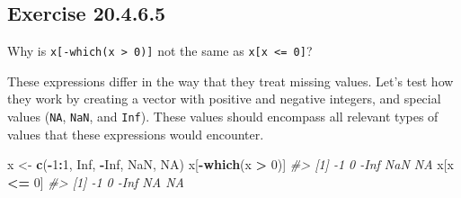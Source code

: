 \documentclass[]{book}
\newenvironment{Shaded}{\begin{snugshade}}{\end{snugshade}}
\newcommand{\CommentTok}[1]{\textcolor[rgb]{0.56,0.35,0.01}{\textit{#1}}}
\newcommand{\ControlFlowTok}[1]{\textcolor[rgb]{0.13,0.29,0.53}{\textbf{#1}}}
\newcommand{\DecValTok}[1]{\textcolor[rgb]{0.00,0.00,0.81}{#1}}
\newcommand{\KeywordTok}[1]{\textcolor[rgb]{0.13,0.29,0.53}{\textbf{#1}}}
\newcommand{\NormalTok}[1]{#1}
\newcommand{\OperatorTok}[1]{\textcolor[rgb]{0.81,0.36,0.00}{\textbf{#1}}}
\newcommand{\OtherTok}[1]{\textcolor[rgb]{0.56,0.35,0.01}{#1}}
\newcommand{\StringTok}[1]{\textcolor[rgb]{0.31,0.60,0.02}{#1}}
\theoremstyle{plain}
\theoremstyle{remark}
\begin{document}
\begin{enumerate}
\begin{Shaded}
\end{Shaded}
\end{enumerate}

\hypertarget{exercise-20.4.6.5}{%
\subsection*{\texorpdfstring{Exercise
{20.4.6.5}}{Exercise 20.4.6.5}}\label{exercise-20.4.6.5}}

Why is \texttt{x{[}-which(x\ \textgreater{}\ 0){]}} not the same as
\texttt{x{[}x\ \textless{}=\ 0{]}}?

These expressions differ in the way that they treat missing values.
Let's test how they work by creating a vector with positive and negative
integers, and special values (\texttt{NA}, \texttt{NaN}, and
\texttt{Inf}). These values should encompass all relevant types of
values that these expressions would encounter.

\begin{Shaded}
\begin{Highlighting}[]
\NormalTok{x <-}\StringTok{ }\KeywordTok{c}\NormalTok{(}\OperatorTok{-}\DecValTok{1}\OperatorTok{:}\DecValTok{1}\NormalTok{, }\OtherTok{Inf}\NormalTok{, }\OperatorTok{-}\OtherTok{Inf}\NormalTok{, }\OtherTok{NaN}\NormalTok{, }\OtherTok{NA}\NormalTok{)}
\NormalTok{x[}\OperatorTok{-}\KeywordTok{which}\NormalTok{(x }\OperatorTok{>}\StringTok{ }\DecValTok{0}\NormalTok{)]}
\CommentTok{#> [1]   -1    0 -Inf  NaN   NA}
\NormalTok{x[x }\OperatorTok{<=}\StringTok{ }\DecValTok{0}\NormalTok{]}
\CommentTok{#> [1]   -1    0 -Inf   NA   NA}
\end{Highlighting}
\end{Shaded}
\end{document}
